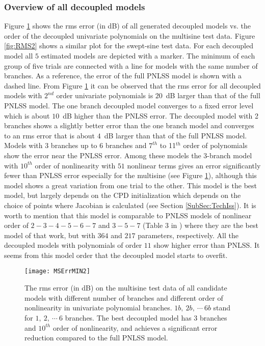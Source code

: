 \documentclass[review]{elsarticle}
\begin{document}
\subsubsection{Overview of all decoupled models}
Figure \ref{fig:RMS1} shows the rms error (in dB) of all generated decoupled models vs. the order of the decoupled univariate polynomials on the multisine test data. Figure \ref{fig:RMS2} shows a similar plot for the swept-sine test data. For each decoupled model all $5$ estimated models are depicted with a marker. The minimum of each group of five trials are connected with a line for models with the same number of branches. As a reference, the error of the full PNLSS model is shown with a dashed line. From Figure \ref{fig:RMS1} it can be observed that the rms error for all decoupled models with $2^{nd}$ order univariate polynomials is $20$~dB larger than that of the full PNLSS model. The one branch decoupled model converges to a fixed error level which is about $10$~dB higher than the PNLSS error. The decoupled model with 2 branches shows a slightly better error than the one branch model and converges to an rms error that is about $4$~dB larger than that of the full PNLSS model. Models with 3 branches up to 6 branches and $7^{th}$ to 11$^{th}$ order of polynomials show the error near the PNLSS error. Among these models the 3-branch model with $10^{th}$ order of nonlinearity with $51$ nonlinear terms gives an error significantly fewer than PNLSS error especially for the 
multisine (see Figure \ref{fig:RMS1}),
although this model shows a great variation from one trial to the other. This model is the best model, but largely depends on the CPD initialization which depends on the choice of points where Jacobian is calculated (see Section \ref{SubSec:TechIss}). It is worth to mention that this model is comparable to PNLSS models of nonlinear order of $2-3-4-5-6-7$ and $3-5-7$ (Table 3 in \citep{Noel}) where they are the best model of that work, but with $364$ and $217$ parameters, respectively. All the decoupled models with polynomials of order $11$ show higher error than PNLSS. It seems from this model order that the decoupled model starts to overfit.
\begin{figure}
\begin{center}
\texttt{[image: MSErrMIN2]}    %
\caption{The rms error (in dB) on the multisine test data of all candidate models with different number of branches and different order of nonlinearity in univariate polynomial branches. $1b,\ 2b, \ \cdots \ 6b$ stand for $1, \ 2, \ \cdots \ 6$ branches.
The best decoupled model has 3 branches and $10^{th}$ order of nonlinearity, and achieves a significant error reduction compared to the full PNLSS model.}
\label{fig:RMS1}
\end{center}
\end{figure}
\end{document}
